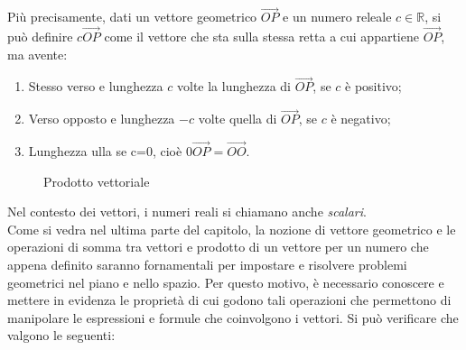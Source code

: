 Più precisamente, dati un vettore geometrico $\vec{OP}$ e un numero releale $c\in\mathds{R}$, si può definire $c\vec{OP}$ come il vettore che sta sulla stessa retta a cui appartiene $\vec{OP}$, ma avente:
\begin{enumerate}
\item Stesso verso e lunghezza $c$ volte la lunghezza di $\vec{OP}$, se $c$ è positivo;
\item Verso opposto e lunghezza $-c$ volte quella di $\vec{OP}$, se $c$ è negativo;
\item Lunghezza ulla se c=0, cioè $0\vec{OP}=\vec{OO}$.
\end{enumerate}
\begin{figure}[ht!]
  \centering
  \resizebox{6cm}{!}{
      
    }
  \caption{Prodotto vettoriale}
  \label{fig:prodottovect}
\end{figure}
Nel contesto dei vettori, i numeri reali si chiamano anche \textit{scalari}.\\
Come si vedra nel ultima parte del capitolo, la nozione di vettore geometrico e le operazioni di somma tra vettori e prodotto di un vettore per un numero che appena definito saranno fornamentali per impostare e risolvere problemi geometrici nel piano e nello spazio. Per questo motivo, è necessario conoscere e mettere in evidenza le proprietà di cui godono tali operazioni che permettono di manipolare le espressioni e formule che coinvolgono i vettori. Si può verificare che valgono le seguenti:
